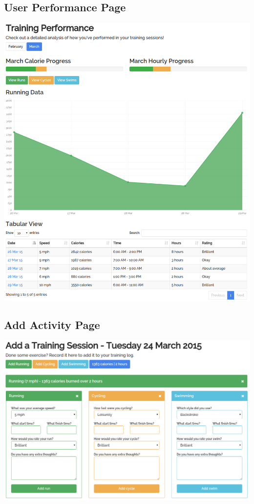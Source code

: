 \documentclass{article}[12pt,a4paper]
\begin{document}
\subsection{User Performance Page}
\includegraphics[scale=0.35]{final_ui/user_performance}

\subsection{Add Activity Page}
\includegraphics[scale=0.35]{final_ui/add_activity}
\end{document}
